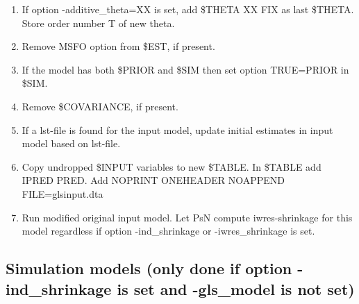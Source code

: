 \begin{enumerate}
\item If option -additive\_theta=XX is set, add \$THETA XX FIX as last \$THETA. Store order number T of new theta.
\item Remove MSFO option from \$EST, if present.
\item If the model has both \$PRIOR and \$SIM then set option TRUE=PRIOR in \$SIM. 
\item Remove \$COVARIANCE, if present.
\item If a lst-file is found for the input model, update initial estimates in input model based on lst-file.
\item Copy undropped \$INPUT variables to new \$TABLE. In \$TABLE add IPRED PRED. Add NOPRINT ONEHEADER NOAPPEND FILE=glsinput.dta
\item Run modified original input model. Let PsN compute iwres-shrinkage for this model regardless if option -ind\_shrinkage or -iwres\_shrinkage is set.
\end{enumerate}

\subsection{Simulation models (only done if option -ind\_shrinkage is set and -gls\_model is not set)}

